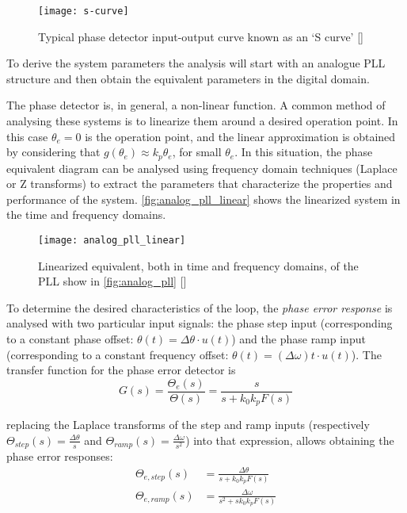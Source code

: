 \begin{figure}[ht]
  \centering
  \texttt{[image: s-curve]}
  \caption{Typical phase detector input-output curve known as an `S curve' [\citeauthor{digcomm_discrete_approach}]}
  \label{fig:s-curve}
\end{figure}

To derive the system parameters the analysis will start with an analogue PLL structure and then obtain the equivalent parameters in the digital domain.

The phase detector is, in general, a non-linear function. A common method of analysing these systems is to linearize them around a desired operation point. In this case $\theta_e=0$ is the operation point, and the linear approximation is obtained by considering that $g(\theta_e)\approx k_p \theta_e$, for small $\theta_e$. In this situation, the phase equivalent diagram can be analysed using frequency domain techniques (Laplace or Z transforms) to extract the parameters that characterize the properties and performance of the system. \autoref{fig:analog_pll_linear} shows the linearized system in the time and frequency domains.

\begin{figure}[ht]
  \centering
  \texttt{[image: analog\_pll\_linear]}
  \caption{Linearized equivalent, both in time and frequency domains, of the PLL show in \autoref{fig:analog_pll} [\citeauthor{digcomm_discrete_approach}]}
  \label{fig:analog_pll_linear}
\end{figure}

To determine the desired characteristics of the loop, the \emph{phase error response} is analysed with two particular input signals: the phase step input (corresponding to a constant phase offset: $\theta(t) = \Delta\theta\cdot u(t)$) and the phase ramp input (corresponding to a constant frequency offset: $\theta(t) = (\Delta \omega)t\cdot u(t)$). The transfer function for the phase error detector is
\begin{equation}
  G(s)=\frac{\Theta_e(s)}{\Theta(s)}=\frac{s}{s+k_0 k_p F(s)}
\end{equation}

replacing the Laplace transforms of the step and ramp inputs (respectively $\Theta_{step}(s)=\frac{\Delta \theta}{s}$ and $\Theta_{ramp}(s)=\frac{\Delta \omega}{s^2}$) into that expression, allows obtaining the phase error responses:
\begin{align}
\Theta_{e,step}(s) & =\frac{\Delta\theta}{s+k_0 k_p F(s)}\\
\Theta_{e,ramp}(s) & =\frac{\Delta\omega}{s^2+s k_0 k_p F(s)}
\end{align}

